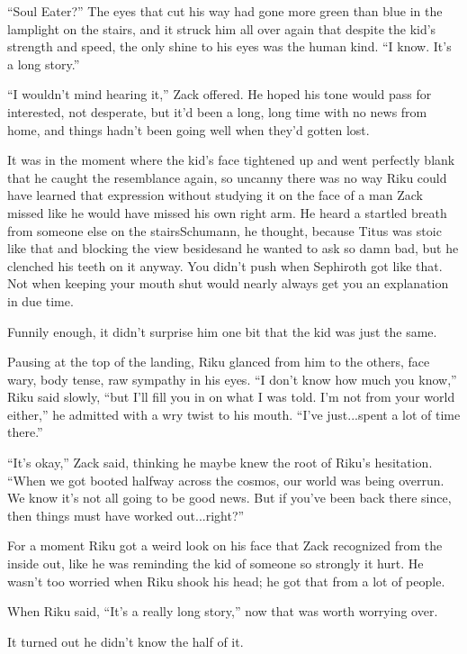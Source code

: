 ``Soul Eater?'' The eyes that cut his way had gone more green than blue in the lamplight on the stairs, and it struck him all over again that despite the kid's strength and speed, the only shine to his eyes was the human kind. ``I know. It's a long story.''

``I wouldn't mind hearing it,'' Zack offered. He hoped his tone would pass for interested, not desperate, but it'd been a long, long time with no news from home, and things hadn't been going well when they'd gotten lost.

It was in the moment where the kid's face tightened up and went perfectly blank that he caught the resemblance again, so uncanny there was no way Riku could have learned that expression without studying it on the face of a man Zack missed like he would have missed his own right arm. He heard a startled breath from someone else on the stairs\textemdash Schumann, he thought, because Titus was stoic like that and blocking the view besides\textemdash and he wanted to ask so damn bad, but he clenched his teeth on it anyway. You didn't push when Sephiroth got like that. Not when keeping your mouth shut would nearly always get you an explanation in due time.

Funnily enough, it didn't surprise him one bit that the kid was just the same.

Pausing at the top of the landing, Riku glanced from him to the others, face wary, body tense, raw sympathy in his eyes. ``I don't know how much you know,'' Riku said slowly, ``but I'll fill you in on what I was told. I'm not from your world either,'' he admitted with a wry twist to his mouth. ``I've just...spent a lot of time there.''

``It's okay,'' Zack said, thinking he maybe knew the root of Riku's hesitation. ``When we got booted halfway across the cosmos, our world was being overrun. We know it's not all going to be good news. But if you've been back there since, then things must have worked out...right?''

For a moment Riku got a weird look on his face that Zack recognized from the inside out, like he was reminding the kid of someone so strongly it hurt. He wasn't too worried when Riku shook his head; he got that from a lot of people.

When Riku said, ``It's a really long story,'' now that was worth worrying over.

It turned out he didn't know the half of it.

\scenechange

